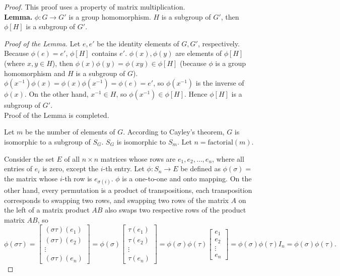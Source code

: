 \begin{proof}
    This proof uses a property of matrix multiplication. \\

    \textbf{Lemma.} $\phi: G\to G'$ is a group homomorphism. $H$ is a subgroup of $G'$, then $\phi[H]$ is a subgroup of $G'$.

    \textit{Proof of the Lemma.} Let $e, e'$ be the identity elements of $G, G'$, respectively. Because $\phi(e) = e'$, $\phi[H]$ contains $e'$. $\phi(x), \phi(y)$ are elements of $\phi[H]$ (where $x,y\in H$), then $\phi(x)\phi(y) = \phi(xy) \in \phi[H]$ (because $\phi$ is a group homomorphism and $H$ is a subgroup of $G$). $\phi(x^{-1})\phi(x) = \phi(x)\phi(x^{-1}) = \phi(e) = e'$, so $\phi(x^{-1})$ is the inverse of $\phi(x)$. On the other hand, $x^{-1}\in H$, so $\phi(x^{-1})\in \phi[H]$. Hence $\phi[H]$ is a subgroup of $G'$. \\

    Proof of the Lemma is completed.

    Let $m$ be the number of elements of $G$. According to Cayley's theorem, $G$ is isomorphic to a subgroup of $S_{G}$. $S_{G}$ is isomorphic to $S_{m}$. Let $n = \text{factorial}(m)$.

    Consider the set $E$ of all $n\times n$ matrices whose rows are $e_{1}, e_{2}, \ldots, e_{n}$, where all entries of $e_{i}$ is zero, except the $i$-th entry. Let $\phi: S_{n} \to E$ be defined as $\phi(\sigma) =$ the matrix whose $i$-th row is $e_{\sigma(i)}$. $\phi$ is a one-to-one and onto mapping. On the other hand, every permutation is a product of transpositions, each transposition corresponds to swapping two rows, and swapping two rows of the matrix $A$ on the left of a matrix product $AB$ also swaps two respective rows of the product matrix $AB$, so
    \[
        \phi(\sigma\tau) = \begin{bmatrix}
            (\sigma\tau)(e_{1}) \\
            (\sigma\tau)(e_{2}) \\
            \vdots              \\
            (\sigma\tau)(e_{n})
        \end{bmatrix}
        = \phi(\sigma)\begin{bmatrix}
            \tau(e_{1}) \\
            \tau(e_{2}) \\
            \vdots      \\
            \tau(e_{n})
        \end{bmatrix}
        = \phi(\sigma)\phi(\tau)\begin{bmatrix}
            e_{1}  \\
            e_{2}  \\
            \vdots \\
            e_{n}
        \end{bmatrix}
        = \phi(\sigma)\phi(\tau)I_{n}
        = \phi(\sigma)\phi(\tau).
    \]


\end{proof}
